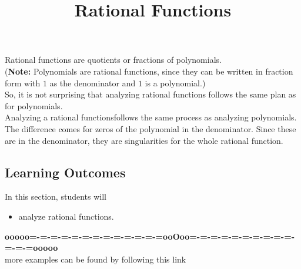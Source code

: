 \documentclass{ximera}
\title{Rational Functions}
\begin{document}
\begin{abstract}
\end{abstract}
\maketitle












Rational functions are quotients or fractions of polynomials.  \\


(\textbf{Note:} Polynomials are rational functions, since they can be written in fraction form with $1$ as the denominator and $1$ is a polynomial.)  \\


So, it is not surprising that analyzing rational functions follows the same plan as for polynomials. \\


Analyzing a rational functionsfollows the same process as analyzing polynomials.  The difference comes for zeros of the polynomial in the denominator.  Since these are in the denominator, they are singularities for the whole rational function.























\subsection{Learning Outcomes}


\begin{sectionOutcomes}
In this section, students will 

\begin{itemize}
\item analyze rational functions.
\end{itemize}
\end{sectionOutcomes}











\begin{center}
\textbf{\textcolor{green!50!black}{ooooo=-=-=-=-=-=-=-=-=-=-=-=-=ooOoo=-=-=-=-=-=-=-=-=-=-=-=-=ooooo}} \\

more examples can be found by following this link\\ 

\end{center}
\end{document}
